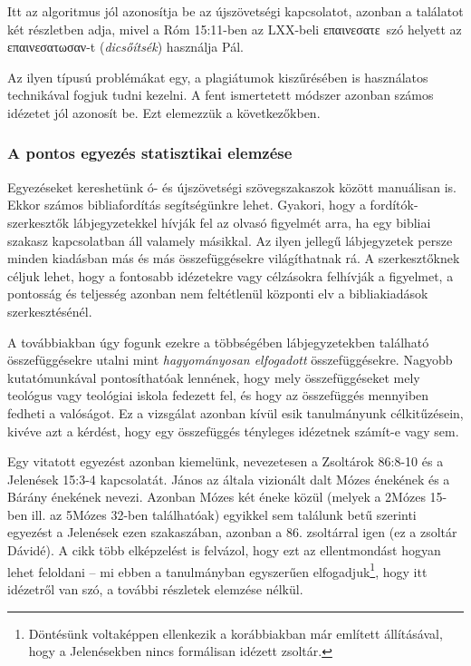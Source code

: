\documentclass{article}
\newcommand\gr{\selectlanguage{greek}\frenchspacing}
\newcommand\hu{\selectlanguage{magyar}\frenchspacing}
\begin{document}
Itt az algoritmus jól azonosítja be az újszövetségi kapcsolatot, azonban a találatot
két részletben adja, mivel a Róm 15:11-ben az LXX-beli \gr επαινεσατε\hu\ szó helyett az
\gr επαινεσατωσαν\hu-t (\textit{dicsőítsék}) használja Pál.


Az ilyen típusú problémákat egy, a plagiátumok kiszűrésében is használatos technikával
fogjuk tudni kezelni. A fent ismertetett módszer azonban számos idézetet jól azonosít be.
Ezt elemezzük a következőkben.

\subsubsection{A pontos egyezés statisztikai elemzése}

Egyezéseket kereshetünk ó- és újszövetségi szövegszakaszok között manuálisan is. Ekkor
számos bibliafordítás segítségünkre lehet. Gyakori, hogy a fordítók-szerkesztők
lábjegyzetekkel hívják fel az olvasó figyelmét arra, ha egy bibliai szakasz
kapcsolatban áll valamely másikkal. Az ilyen jellegű lábjegyzetek persze
minden kiadásban más és más összefüggésekre világíthatnak rá. A szerkesztőknek
céljuk lehet, hogy a fontosabb idézetekre vagy célzásokra felhívják a figyelmet,
a pontosság és teljesség azonban nem feltétlenül központi elv a bibliakiadások szerkesztésénél.

A továbbiakban úgy fogunk ezekre a többségében lábjegyzetekben található
összefüggésekre utalni mint \textit{hagyományosan elfogadott} összefüggésekre.
Nagyobb kutatómunkával pontosíthatóak lennének, hogy mely összefüggéseket
mely teológus vagy teológiai iskola fedezett fel, és hogy az összefüggés
mennyiben fedheti a valóságot. Ez a vizsgálat azonban kívül esik tanulmányunk célkitűzésein,
kivéve azt a kérdést, hogy egy összefüggés tényleges idézetnek számít-e vagy sem.

Egy vitatott egyezést azonban kiemelünk, nevezetesen a Zsoltárok 86:8-10 és a Jelenések
15:3-4 kapcsolatát. János az általa vizionált dalt Mózes énekének és a Bárány énekének nevezi.
Azonban Mózes két éneke közül (melyek a 2Mózes 15-ben ill. az 5Mózes 32-ben találhatóak)
egyikkel sem találunk betű szerinti egyezést a Jelenések ezen szakaszában, azonban a 86. zsoltárral
igen (ez a zsoltár Dávidé). A \cite{Moyise} cikk több elképzelést is felvázol, hogy
ezt az ellentmondást hogyan lehet feloldani -- mi ebben a tanulmányban egyszerűen elfogadjuk\footnote{Döntésünk
voltaképpen ellenkezik a korábbiakban már említett \cite{SungKukKim} állításával, hogy
a Jelenésekben nincs formálisan idézett zsoltár.},
hogy itt idézetről van szó, a további részletek elemzése nélkül.
\end{document}
